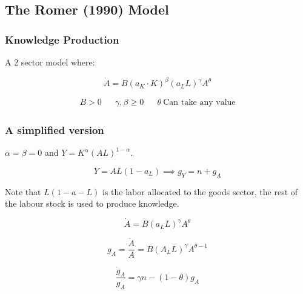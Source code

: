 \subsection{ The Romer (1990) Model}

\subsubsection{Knowledge Production}

A 2 sector model where:

\begin{center}
\end{center}

\begin{equation*}
    \Dot{A}=B(a_{K}\cdot K)^\beta (a_{L}L)^\gamma A^\theta 
\end{equation*}

\begin{align*}
    B>0 && \gamma,\beta \geq 0 && \theta \ \text{Can take any value}
\end{align*}

\subsubsection{A simplified version}

$\alpha=\beta=0$ and $Y=K^\alpha(AL)^{1-\alpha}$.

\begin{equation*}
    Y=AL(1-a_{L}) \implies g_{Y}=n+g_{A}
\end{equation*}

Note that $L(1-a-{L})$ is the labor allocated to the goods sector, the rest of the labour stock is used to produce knowledge.  

\begin{equation*}
    \Dot{A}=B(a_{L}L)^\gamma A^\theta
\end{equation*}

\begin{equation*}
    g_{A}=\frac{\Dot{A}}{A}=B(A_{L}L)^\gamma A^{\theta-1}
\end{equation*}

\begin{equation*}
    \frac{\Dot{g}_{A}}{g_{A}}=\gamma n - (1-\theta)g_{A}
\end{equation*}

